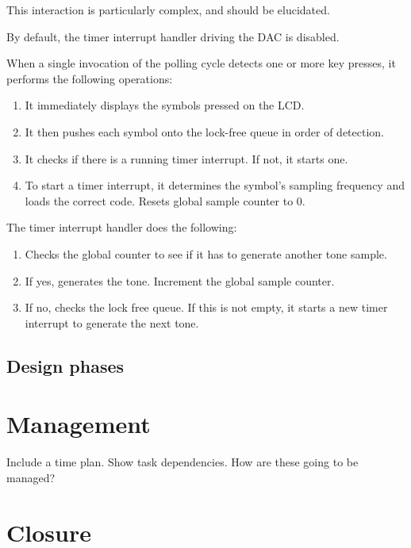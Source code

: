 \documentclass[11pt,a4paper
]{scrartcl}
\begin{document}
This interaction is particularly complex, and should be elucidated.

By default, the timer interrupt handler driving the DAC is disabled.

When a single invocation of the polling cycle detects one or more key presses, it performs the following operations:

\begin{enumerate}
   \item It immediately displays the symbols pressed on the LCD.
   \item It then pushes each symbol onto the lock-free queue in order of detection.
   \item It checks if there is a running timer interrupt. If not, it starts one.
   \item To start a timer interrupt, it determines the symbol's sampling frequency and loads the correct code. Resets global sample counter to 0.
\end{enumerate}

The timer interrupt handler does the following:

\begin{enumerate}
   \item Checks the global counter to see if it has to generate another tone sample.
   \item If yes, generates the tone. Increment the global sample counter.
   \item If no, checks the lock free queue. If this is not empty, it starts a new timer interrupt to generate the next tone.
\end{enumerate}

\subsection{Design phases}


\section{Management}
Include a time plan.
Show task dependencies.
How are these going to be managed?

\section{Closure}



\end{document}
